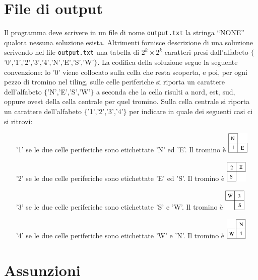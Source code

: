 \documentclass[a4paper,11pt]{article}
\newcommand{\file}[1]{\texttt{#1}}
\begin{document}
\section*{File di output}
Il programma deve scrivere in un file di nome \file{output.txt} la stringa ``NONE'' qualora nessuna soluzione esista.
Altrimenti fornisce descrizione di una soluzione scrivendo nel file \file{output.txt} una tabella di $2^k\times 2^k$ caratteri presi dall'alfabeto $\{$'0','1','2','3','4','N','E','S','W'$\}$. La codifica della soluzione segue la seguente convenzione:
lo '0' viene collocato sulla cella che resta scoperta, e poi, per ogni pezzo di tromino nel tiling, sulle celle periferiche si riporta un carattere dell'alfabeto $\{$'N','E','S','W'$\}$ a seconda che la cella risulti a nord, est, sud, oppure ovest della cella centrale per quel tromino. Sulla cella centrale si riporta un carattere dell'alfabeto 
$\{$'1','2','3','4'$\}$ per indicare in quale dei seguenti casi ci si ritrovi:
\begin{itemize}
   \item['1'] se le due celle periferiche sono etichettate 'N' ed 'E'. Il tromino \`e \includegraphics[height=0.4in,width=0.4in, keepaspectratio]{L1.pdf} 
   \item['2'] se le due celle periferiche sono etichettate 'E' ed 'S'. Il tromino \`e \includegraphics[height=0.4in,width=0.4in, keepaspectratio]{L2.pdf}
   \item['3'] se le due celle periferiche sono etichettate 'S' e 'W'. Il tromino \`e \includegraphics[height=0.4in,width=0.4in, keepaspectratio]{L3.pdf}
   \item['4'] se le due celle periferiche sono etichettate 'W' e 'N'. Il tromino \`e \includegraphics[height=0.4in,width=0.4in, keepaspectratio]{L4.pdf}  
\end{itemize}


\section*{Assunzioni}
\end{document}
